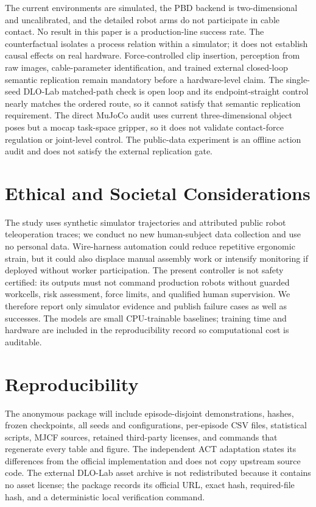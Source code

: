 \documentclass[journal]{IEEEtran}
\begin{document}
The current environments are simulated, the PBD backend is two-dimensional and
uncalibrated, and the detailed robot arms do not participate in cable contact.
No result in this paper is a production-line success rate.  The counterfactual
isolates a process relation within a simulator; it does not establish causal
effects on real hardware. Force-controlled clip insertion, perception from
raw images, cable-parameter identification, and trained external closed-loop
semantic replication remain mandatory before a hardware-level claim. The
single-seed DLO-Lab matched-path check is open loop and its endpoint-straight
control nearly matches the ordered route, so it cannot satisfy that semantic
replication requirement. The direct MuJoCo audit uses
current three-dimensional object poses but a mocap task-space gripper, so it
does not validate contact-force regulation or joint-level control.  The
public-data experiment is an offline action audit and does not satisfy the
external replication gate.

\section{Ethical and Societal Considerations}

The study uses synthetic simulator trajectories and attributed public robot
teleoperation traces; we conduct no new human-subject data collection and use
no personal data.  Wire-harness
automation could reduce repetitive ergonomic strain, but it
could also displace manual assembly work or intensify monitoring if deployed
without worker participation.  The present controller is not safety certified:
its outputs must not command production robots without guarded workcells, risk
assessment, force limits, and qualified human supervision.  We therefore report
only simulator evidence and publish failure cases as well as successes.  The
models are small CPU-trainable baselines; training time and hardware are included
in the reproducibility record so computational cost is auditable.

\section{Reproducibility}

The anonymous package will include episode-disjoint demonstrations, hashes,
frozen checkpoints, all seeds and configurations, per-episode CSV files,
statistical scripts, MJCF sources, retained third-party licenses, and commands
that regenerate every table and figure.  The independent ACT adaptation states
its differences from the official implementation and does not copy upstream
source code. The external DLO-Lab asset archive is not redistributed because
it contains no asset license; the package records its official URL, exact hash,
required-file hash, and a deterministic local verification command.

\balance


\end{document}
